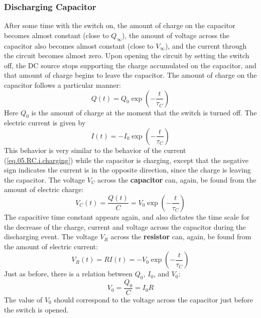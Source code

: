 \subsubsection{Discharging Capacitor}
After some time with the switch on, the amount of charge on the capacitor becomes almost constant (close to $Q_{\infty}$), the amount of voltage across the capacitor also becomes almost constant (close to $V_{\infty}$), and the current through the circuit becomes almost zero. Upon opening the circuit by setting the switch off, the DC source stops supporting the charge accumulated on the capacitor, and that amount of charge begins to leave the capacitor. The amount of charge on the capacitor follows a particular manner:
\begin{equation}
    Q(t) = Q_{0} \exp\left(-\frac{t}{\tau_{C}}\right)
    \label{eq.05.RC.q.discharging}
\end{equation}
Here $Q_{0}$ is the amount of charge at the moment that the switch is turned off. The electric current is given by
\begin{equation}
    I(t) = - I_{0} \exp\left(-\frac{t}{\tau_{C}}\right)
    \label{eq.05.RC.i.discharging}
\end{equation}
This behavior is very similar to the behavior of the current (\ref{eq.05.RC.i.charging}) while the capacitor is charging, except that the negative sign indicates the current is in the opposite direction, since the charge is leaving the capacitor. The voltage $V_{C}$ across the \textbf{capacitor} can, again, be found from the amount of electric charge:
\begin{equation}
    V_{C}(t) = \frac{Q(t)}{C} = V_{0} \exp\left(-\frac{t}{\tau_{C}}\right)
    \label{eq.05.RC.vC.discharging}
\end{equation}
The capacitive time constant appears again, and also dictates the time scale for the decrease of the charge, current and voltage across the capacitor during the discharging event. The voltage $V_{R}$ across the \textbf{resistor} can, again, be found from the amount of electric current:
\begin{equation}
    V_{R}(t) = R I(t) = - V_{0} \exp\left(-\frac{t}{\tau_{C}}\right)
\end{equation}
Just as before, there is a relation between $Q_{0}$, $I_{0}$, and $V_{0}$:
\begin{equation}
    V_{0} = \frac{Q_{0}}{C} = I_{0} R
\end{equation}
The value of $V_{0}$ should correspond to the voltage across the capacitor just before the switch is opened.
